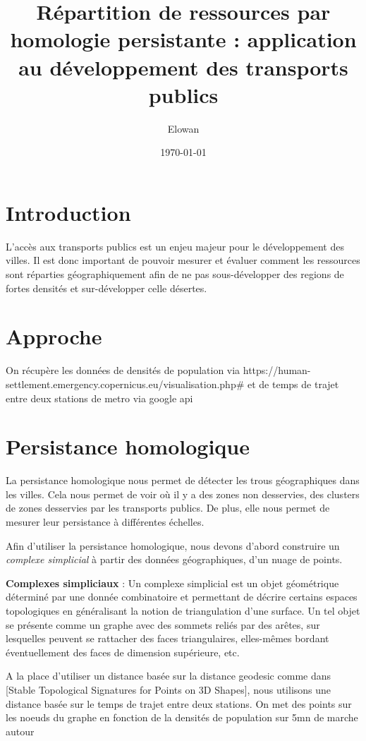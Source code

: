 \documentclass{article}
\begin{document}
\title{Répartition de ressources par homologie persistante : 
    application au développement des transports publics}
\author{Elowan}
\date{\today}

\maketitle

\section{Introduction}
L'accès aux transports publics est un enjeu majeur pour le développement des 
villes. Il est donc important de pouvoir mesurer et évaluer comment les
ressources sont réparties géographiquement afin de ne pas sous-développer
des regions de fortes densités et sur-développer celle désertes.

\section{Approche}
On récupère les données de densités de population via https://human-settlement.emergency.copernicus.eu/visualisation.php#
et de temps de trajet entre deux stations de metro via google api

\section{Persistance homologique}

La persistance homologique nous permet de détecter les trous géographiques
dans les villes. Cela nous permet de voir où il y a des zones non desservies,
des clusters de zones desservies par les transports publics. De plus, elle 
nous permet de mesurer leur persistance à différentes échelles.

Afin d'utiliser la persistance homologique, nous devons d'abord construire
un \textit{complexe simplicial} à partir des données géographiques, d'un nuage 
de points.

\textbf{Complexes simpliciaux} : Un complexe simplicial est un objet géométrique 
déterminé par une donnée combinatoire et permettant de décrire certains 
espaces topologiques en généralisant la notion de triangulation d'une surface. 
Un tel objet se présente comme un graphe avec des sommets reliés par des arêtes,
sur lesquelles peuvent se rattacher des faces triangulaires, elles-mêmes bordant 
éventuellement des faces de dimension supérieure, etc. 

A la place d'utiliser un distance basée sur la distance geodesic comme dans 
[Stable Topological Signatures for Points on 3D Shapes], nous utilisons une 
distance basée sur le temps de trajet entre deux stations. On met des points
sur les noeuds du graphe en fonction de la densités de population sur 5mn de marche 
autour
\end{document}
